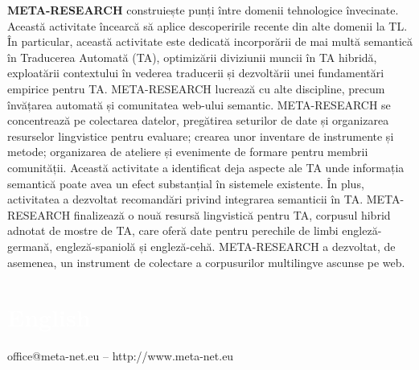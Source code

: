 \begin{multicols}{2}
\textbf{META-RESEARCH} construiește punți între domenii tehnologice învecinate. Această activitate încearcă să aplice descoperirile recente din alte domenii la TL. În particular, această activitate este dedicată incorporării de mai multă semantică în Traducerea Automată (TA), optimizării diviziunii muncii în TA hibridă, exploatării contextului în vederea traducerii și dezvoltării unei fundamentări empirice pentru TA. META-RESEARCH lucrează cu alte discipline, precum învățarea automată și comunitatea web-ului semantic. META-RESEARCH se concentrează pe colectarea datelor, pregătirea seturilor de date și organizarea resurselor lingvistice pentru evaluare; crearea unor inventare de instrumente și metode; organizarea de ateliere și evenimente de formare pentru membrii comunității. Această activitate a identificat deja aspecte ale TA unde informația semantică poate avea un efect substanțial în sistemele existente. În plus, activitatea a dezvoltat recomandări privind integrarea semanticii în TA. META-RESEARCH finalizează o nouă resursă lingvistică pentru TA, corpusul hibrid adnotat de mostre de TA, care oferă date pentru perechile de limbi engleză-germană, engleză-spaniolă și engleză-cehă. META-RESEARCH a dezvoltat, de asemenea, un instrument de colectare a corpusurilor multilingve ascunse pe web.

\end{multicols}


\makeatletter
{}
{
  \renewcommand*{\theHsection}{\thepart.\thesection}
}
\makeatother
\part*{\textcolor{white}{English}}
\vfill\centerline{office@meta-net.eu -- http://www.meta-net.eu}
\setcounter{section}{0}
\setcounter{figure}{0}

\clearpage



